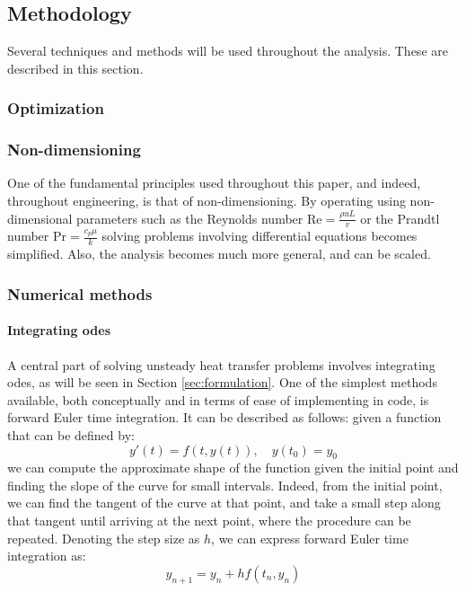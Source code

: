 \subsection{Methodology}

Several techniques and methods will be used throughout the analysis. These are described in this section.

\subsubsection{Optimization}
\subsubsection{Non-dimensioning}

One of the fundamental principles used throughout this paper, and indeed, throughout engineering, is that of non-dimensioning. By operating using non-dimensional parameters such as the Reynolds number $\text{Re} = \frac{\rho u L}{v}$ or the Prandtl number $\text{Pr} = \frac{c_p \mu}{k}$ solving problems involving differential equations becomes simplified. Also, the analysis becomes much more general, and can be scaled.

\subsubsection{Numerical methods}
\label{sec:numerical_methods}
\paragraph{Integrating \glspl{ode}}

A central part of solving unsteady heat transfer problems involves integrating \glspl{ode}, as will be seen in Section \ref{sec:formulation}. One of the simplest methods available, both conceptually and in terms of ease of implementing in code, is forward Euler time integration. It can be described as follows: given a function that can be defined by: 
\begin{equation}
y'(t) = f(t,y(t)), \quad y(t_0) = y_0
\end{equation}
we can compute the approximate shape of the function given the initial point and finding the slope of the curve for small intervals. Indeed, from the initial point, we can find the tangent of the curve at that point, and take a small step along that tangent until arriving at the next point, where the procedure can be repeated. Denoting the step size as $h$, we can express forward Euler time integration as:
\begin{equation}
y_{n+1} =  y_n + hf(t_n,y_n)
\end{equation}

